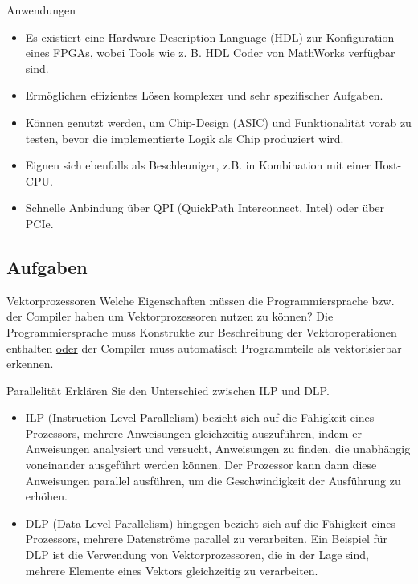 \begin{defi}{Anwendungen}
    \begin{itemize}
        \item Es existiert eine Hardware Description Language (HDL) zur Konfiguration eines FPGAs, wobei Tools wie z. B. HDL Coder von MathWorks verfügbar sind.
        \item Ermöglichen effizientes Lösen komplexer und sehr spezifischer Aufgaben.
        \item Können genutzt werden, um Chip-Design (ASIC) und Funktionalität vorab zu testen, bevor die implementierte Logik als Chip produziert wird.
        \item Eignen sich ebenfalls als Beschleuniger, z.B. in Kombination mit einer Host-CPU.
        \item Schnelle Anbindung über QPI (QuickPath Interconnect, Intel) oder über PCIe.
    \end{itemize}
\end{defi}

\subsection{Aufgaben}

\begin{aufgabe}{Vektorprozessoren}
    Welche Eigenschaften müssen die Programmiersprache bzw. der Compiler haben um Vektorprozessoren nutzen zu können?
    \tcblower
    Die Programmiersprache muss Konstrukte zur Beschreibung der Vektoroperationen enthalten
    \underline{oder} der Compiler muss automatisch Programmteile als vektorisierbar erkennen.
\end{aufgabe}

\begin{aufgabe}{Parallelität}
    Erklären Sie den Unterschied zwischen ILP und DLP.
    \tcblower
    \begin{itemize}
        \item ILP (Instruction-Level Parallelism) bezieht sich auf die Fähigkeit eines Prozessors,
              mehrere Anweisungen gleichzeitig auszuführen,
              indem er Anweisungen analysiert und versucht,
              Anweisungen zu finden,
              die unabhängig voneinander ausgeführt werden können.
              Der Prozessor kann dann diese Anweisungen parallel ausführen,
              um die Geschwindigkeit der Ausführung zu erhöhen.
        \item DLP (Data-Level Parallelism) hingegen bezieht sich auf die Fähigkeit eines Prozessors,
              mehrere Datenströme parallel zu verarbeiten.
              Ein Beispiel für DLP ist die Verwendung von Vektorprozessoren,
              die in der Lage sind,
              mehrere Elemente eines Vektors gleichzeitig zu verarbeiten.
    \end{itemize}
\end{aufgabe}


